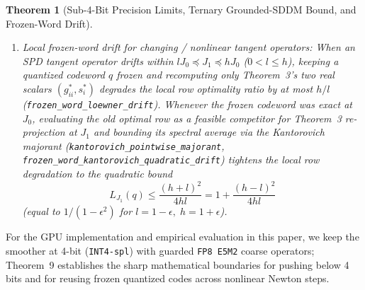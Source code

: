 \documentclass[10pt]{article}
\newtheorem{theorem}{Theorem}
\begin{document}
\begin{theorem}[Sub-4-Bit Precision Limits, Ternary Grounded-SDDM Bound, and Frozen-Word Drift]
\begin{enumerate}
  \item \emph{Local frozen-word drift for changing / nonlinear tangent operators:} When an SPD tangent operator drifts within $l J_0 \preceq J_1 \preceq h J_0$ ($0 < l \le h$), keeping a quantized codeword $q$ frozen and recomputing only Theorem~3's two real scalars $(g_{ii}^*, s_i^*)$ degrades the local row optimality ratio by at most $h/l$ (\texttt{frozen\_word\_loewner\_drift}). Whenever the frozen codeword was exact at $J_0$, evaluating the old optimal row as a feasible competitor for Theorem~3 re-projection at $J_1$ and bounding its spectral average via the Kantorovich majorant (\texttt{kantorovich\_pointwise\_majorant}, \texttt{frozen\_word\_kantorovich\_quadratic\_drift}) tightens the local row degradation to the quadratic bound
  \[
    L_{J_1}(q) \le \frac{(h + l)^2}{4 h l} = 1 + \frac{(h - l)^2}{4 h l}
  \]
  (equal to $1/(1 - \epsilon^2)$ for $l = 1 - \epsilon,\; h = 1 + \epsilon$).
\end{enumerate}
\end{theorem}

For the GPU implementation and empirical evaluation in this paper, we keep the smoother at 4-bit (\texttt{INT4-spl}) with guarded \texttt{FP8 E5M2} coarse operators; Theorem~9 establishes the sharp mathematical boundaries for pushing below 4 bits and for reusing frozen quantized codes across nonlinear Newton steps.
\end{document}
